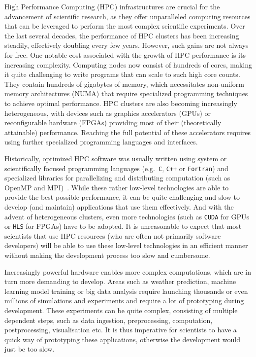 High Performance Computing (HPC) infrastructures are crucial for the advancement of scientific
research, as they offer unparalleled computing resources that can be leveraged to perform the most
complex scientific experiments. Over the last several decades, the performance of HPC clusters
has been increasing steadily, effectively doubling every few years. However, such gains are not
always for free. One notable cost associated with the growth of HPC performance is its
increasing complexity. Computing nodes now consist of hundreds of cores, making it quite
challenging to write programs that can scale to such high core counts. They contain hundreds of
gigabytes of memory, which necessitates non-uniform memory architectures (NUMA) that require
specialized programming techniques to achieve optimal performance. HPC clusters are also becoming
increasingly heterogeneous, with devices such as graphics accelerators (GPUs) or reconfigurable
hardware (FPGAs) providing most of their (theoretically attainable) performance. Reaching the
full potential of these accelerators requires using further specialized programming languages
and interfaces.

Historically, optimized HPC software was usually written using system or scientifically focused
programming languages (e.g.~\texttt{C}, \texttt{C++} or \texttt{Fortran}) and specialized libraries
for parallelizing and distributing computation (such as OpenMP and MPI)~\cite{mpistudy}. While
these rather low-level technologies are able to provide the best possible performance, it can be
quite challenging and slow to develop (and maintain) applications that use them effectively. And
with the advent of heterogeneous clusters, even more technologies (such as \texttt{CUDA} for GPUs
or \texttt{HLS} for FPGAs) have to be adopted. It is unreasonable to expect that most scientists
that use HPC resources (who are often not primarily software developers) will be able to use these
low-level technologies in an efficient manner without making the development process too slow
and cumbersome.

Increasingly powerful hardware enables more complex computations, which are in turn more
demanding to develop. Areas such as weather prediction, machine learning model training or big
data analysis require launching thousands or even millions of simulations and experiments and
require a lot of prototyping during development.
These experiments can be quite complex, consisting of multiple dependent steps, such as data
ingestion, preprocessing, computation, postprocessing, visualisation etc. It is thus imperative for
scientists to have a quick way of prototyping these applications, otherwise the development
would just be too slow.

